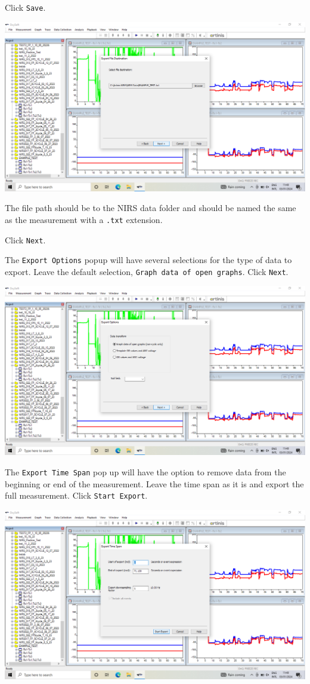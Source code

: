 \documentclass[
]{book}
\begin{document}
Click \texttt{Save}.

\includegraphics[width=1\linewidth]{images/exportmeasurement/6_chosenfilelocation}

The file path should be to the NIRS data folder and should be named the same as the measurement with a \texttt{.txt} extension.

Click \texttt{Next}.

The \texttt{Export\ Options} popup will have several selections for the type of data to export. Leave the default selection, \texttt{Graph\ data\ of\ open\ graphs}. Click \texttt{Next}.

\includegraphics[width=1\linewidth]{images/exportmeasurement/7_chooseexportopengraphs}

The \texttt{Export\ Time\ Span} pop up will have the option to remove data from the beginning or end of the measurement. Leave the time span as it is and export the full measurement. Click \texttt{Start\ Export}.

\includegraphics[width=1\linewidth]{images/exportmeasurement/8_exportwholemeasurement}
\end{document}
